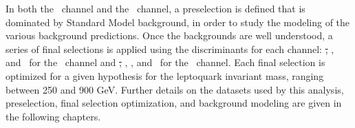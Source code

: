 In both the \eejj~channel and the \enujj~channel, 
a preselection is defined that is dominated by Standard Model
background, in order to study the modeling of the various background
predictions.  Once the backgrounds are well understood,
a series of final selections is applied using the discriminants for each
channel: 
\st, \mee, and \mejmin~for the \eejj~channel and 
\st, \mt, \met, and \mej~for the \enujj~channel.
Each final selection is optimized for a given hypothesis for the leptoquark invariant mass,
ranging between 250 and 900 GeV.
Further details on the datasets used by this analysis, preselection, final selection optimization,
and background modeling are given in the following chapters.
